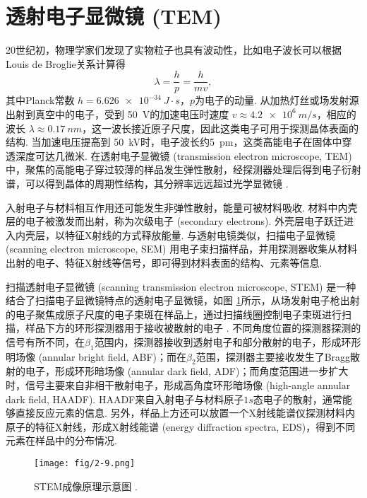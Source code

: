 \documentclass[12pt,a4paper,openany,twoside,UTF-8]{book}
\begin{document}
\section{透射电子显微镜 (TEM)}
20世纪初，物理学家们发现了实物粒子也具有波动性，比如电子波长可以根据Louis de Broglie关系计算得
\begin{equation}
\lambda = \frac{h}{p} = \frac{h}{mv},
\label{eq:2-8}
\end{equation}
其中Planck常数 $h = \SI{6.626e-34}{J\cdot s}$，$p$为电子的动量. 从加热灯丝或场发射源出射到真空中的电子，受到 \SI{50}{V}的加速电压时速度 $v\approx\SI{4.2e6}{m/s}$，相应的波长 $\lambda\approx\SI{0.17}{nm}$，这一波长接近原子尺度，因此这类电子可用于探测晶体表面的结构. 当加速电压提高到 \SI{50}{kV}时，电子波长约\SI{5}{pm}，这类高能电子在固体中穿透深度可达几微米. 在透射电子显微镜 (transmission electron microscope, TEM) 中，聚焦的高能电子穿过较薄的样品发生弹性散射，经探测器处理后得到电子衍射谱，可以得到晶体的周期性结构，其分辨率远远超过光学显微镜 \cite{ref29}. 

入射电子与材料相互作用还可能发生非弹性散射，能量可被材料吸收. 材料中内壳层的电子被激发而出射，称为次级电子 (secondary electrons). 外壳层电子跃迁进入内壳层，以特征X射线的方式释放能量. 与透射电镜类似，扫描电子显微镜 (scanning electron microscope, SEM) 用电子束扫描样品，并用探测器收集从材料出射的电子、特征X射线等信号，即可得到材料表面的结构、元素等信息.
 
扫描透射电子显微镜 (scanning transmission electron microscope, STEM) 是一种结合了扫描电子显微镜特点的透射电子显微镜，如图 \ref{fig:2-9}所示，从场发射电子枪出射的电子聚焦成原子尺度的电子束斑在样品上，通过扫描线圈控制电子束斑进行扫描，样品下方的环形探测器用于接收被散射的电子 \cite{ref30}. 不同角度位置的探测器探测的信号有所不同，在$\beta_1$范围内，探测器接收到透射电子和部分散射的电子，形成环形明场像 (annular bright field, ABF)；而在$\beta_2$范围，探测器主要接收发生了Bragg散射的电子，形成环形暗场像 (annular dark field, ADF)；而角度范围进一步扩大时，信号主要来自非相干散射电子，形成高角度环形暗场像 (high-angle annular dark field, HAADF). HAADF来自入射电子与材料原子$1s$态电子的散射，通常能够直接反应元素的信息. 另外，样品上方还可以放置一个X射线能谱仪探测材料内原子的特征X射线，形成X射线能谱 (energy diffraction spectra, EDS)，得到不同元素在样品中的分布情况.

\begin{figure}[htbp]
\centering
\texttt{[image: fig/2-9.png]}
\caption{STEM成像原理示意图 \cite{ref30}.}
\label{fig:2-9} 
\end{figure}
\end{document}

